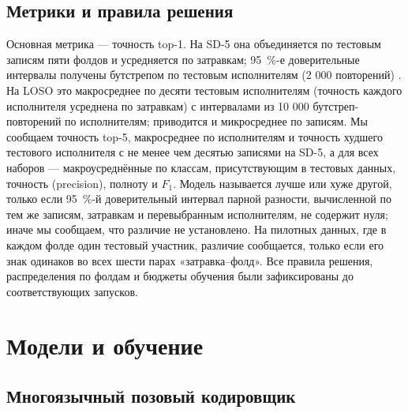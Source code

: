 \documentclass[a4paper,fleqn]{cas-dc}
\begin{document}
\hypertarget{ux43cux435ux442ux440ux438ux43aux438-ux438-ux43fux440ux430ux432ux438ux43bux430-ux440ux435ux448ux435ux43dux438ux44f}{%
\subsection{Метрики и правила решения}\label{ux43cux435ux442ux440ux438ux43aux438-ux438-ux43fux440ux430ux432ux438ux43bux430-ux440ux435ux448ux435ux43dux438ux44f}}

Основная метрика --- точность top-1. На SD-5 она объединяется по тестовым записям пяти фолдов и усредняется по затравкам; 95~\%-е доверительные интервалы получены бутстрепом по тестовым исполнителям (2 000 повторений) \cite{2016_efron_hastie_casi}. На LOSO это макросреднее по десяти тестовым исполнителям (точность каждого исполнителя усреднена по затравкам) с интервалами из 10 000 бутстреп-повторений по исполнителям; приводится и микросреднее по записям. Мы сообщаем точность top-5, макросреднее по исполнителям и точность худшего тестового исполнителя с не менее чем десятью записями на SD-5, а для всех наборов --- макроусреднённые по классам, присутствующим в тестовых данных, точность (precision), полноту и \(F_1\). Модель называется лучше или хуже другой, только если 95~\%-й доверительный интервал парной разности, вычисленной по тем же записям, затравкам и перевыбранным исполнителям, не содержит нуля; иначе мы сообщаем, что различие не установлено. На пилотных данных, где в каждом фолде один тестовый участник, различие сообщается, только если его знак одинаков во всех шести парах «затравка--фолд». Все правила решения, распределения по фолдам и бюджеты обучения были зафиксированы до соответствующих запусков.

\hypertarget{ux43cux43eux434ux435ux43bux438-ux438-ux43eux431ux443ux447ux435ux43dux438ux435}{%
\section{Модели и обучение}\label{ux43cux43eux434ux435ux43bux438-ux438-ux43eux431ux443ux447ux435ux43dux438ux435}}

\hypertarget{ux43cux43dux43eux433ux43eux44fux437ux44bux447ux43dux44bux439-ux43fux43eux437ux43eux432ux44bux439-ux43aux43eux434ux438ux440ux43eux432ux449ux438ux43a}{%
\subsection{Многоязычный позовый кодировщик}\label{ux43cux43dux43eux433ux43eux44fux437ux44bux447ux43dux44bux439-ux43fux43eux437ux43eux432ux44bux439-ux43aux43eux434ux438ux440ux43eux432ux449ux438ux43a}}
\end{document}
